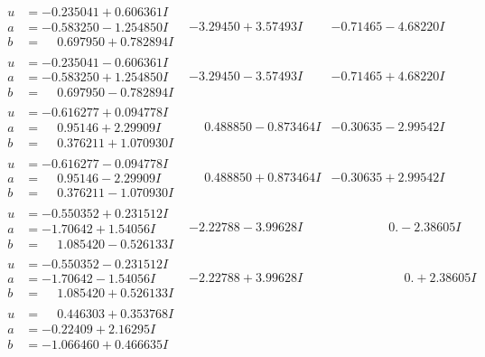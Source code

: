 \documentclass[1p]{elsarticle_modified}
\theoremstyle{definition}
\begin{document}
$$\begin{array}{c|c|c}
\begin{aligned}
u &= -0.235041 + 0.606361 I \\
a &= -0.583250 - 1.254850 I \\
b &= \phantom{-}0.697950 + 0.782894 I\end{aligned}
 & -3.29450 + 3.57493 I & -0.71465 - 4.68220 I \\ \hline\begin{aligned}
u &= -0.235041 - 0.606361 I \\
a &= -0.583250 + 1.254850 I \\
b &= \phantom{-}0.697950 - 0.782894 I\end{aligned}
 & -3.29450 - 3.57493 I & -0.71465 + 4.68220 I \\ \hline\begin{aligned}
u &= -0.616277 + 0.094778 I \\
a &= \phantom{-}0.95146 + 2.29909 I \\
b &= \phantom{-}0.376211 + 1.070930 I\end{aligned}
 & \phantom{-}0.488850 - 0.873464 I & -0.30635 - 2.99542 I \\ \hline\begin{aligned}
u &= -0.616277 - 0.094778 I \\
a &= \phantom{-}0.95146 - 2.29909 I \\
b &= \phantom{-}0.376211 - 1.070930 I\end{aligned}
 & \phantom{-}0.488850 + 0.873464 I & -0.30635 + 2.99542 I \\ \hline\begin{aligned}
u &= -0.550352 + 0.231512 I \\
a &= -1.70642 + 1.54056 I \\
b &= \phantom{-}1.085420 - 0.526133 I\end{aligned}
 & -2.22788 - 3.99628 I & \phantom{-0.000000 } 0. - 2.38605 I \\ \hline\begin{aligned}
u &= -0.550352 - 0.231512 I \\
a &= -1.70642 - 1.54056 I \\
b &= \phantom{-}1.085420 + 0.526133 I\end{aligned}
 & -2.22788 + 3.99628 I & \phantom{-0.000000 -}0. + 2.38605 I \\ \hline\begin{aligned}
u &= \phantom{-}0.446303 + 0.353768 I \\
a &= -0.22409 + 2.16295 I \\
b &= -1.066460 + 0.466635 I\end{aligned}

\end{array}$$
\end{document}
